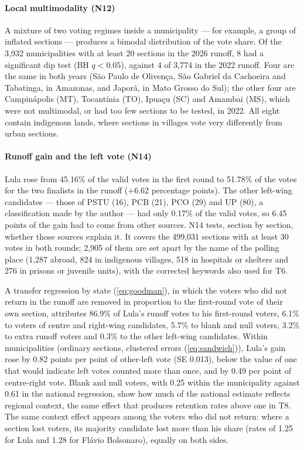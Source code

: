 \paragraph{Local multimodality (N12)} A mixture of two voting regimes inside
a municipality --- for example, a group of inflated sections --- produces a
bimodal distribution of the vote share. Of the 3,932 municipalities with at
least 20 sections in the 2026 runoff, 8 had a significant dip test (BH
$q<0.05$), against 4 of 3,774 in the 2022 runoff. Four are the same in both
years (S\~ao Paulo de Oliven\c{c}a, S\~ao Gabriel da Cachoeira and Tabatinga,
in Amazonas, and Japor\~a, in Mato Grosso do Sul); the other four are
Campin\'apolis (MT), Tocant\'inia (TO), Ipua\c{c}u (SC) and Amambai (MS),
which were not multimodal, or had too few sections to be tested, in 2022.
All eight contain indigenous lands, where sections in villages vote very
differently from urban sections.

\paragraph{Runoff gain and the left vote (N14)} Lula rose from 45.16\% of
the valid votes in the first round to 51.78\% of the votes for the two
finalists in the runoff (+6.62 percentage points). The other left-wing
candidates --- those of PSTU (16), PCB (21), PCO (29) and UP (80), a
classification made by the author --- had only 0.17\% of the valid votes,
so 6.45 points of the gain had to come from other sources. N14 tests,
section by section, whether those sources explain it. It covers the 499,031
sections with at least 30 votes in both rounds; 2,905 of them are set apart
by the name of the polling place (1,287 abroad, 824 in indigenous villages,
518 in hospitals or shelters and 276 in prisons or juvenile units), with the
corrected keywords also used for T6.

A transfer regression by state (\ref{eq:goodman}), in which the voters who
did not return in the runoff are removed in proportion to the first-round
vote of their own section, attributes 86.9\% of Lula's runoff votes to his
first-round voters, 6.1\% to voters of centre and right-wing candidates,
5.7\% to blank and null voters, 3.2\% to extra runoff voters and 0.3\% to
the other left-wing candidates. Within municipalities (ordinary sections,
clustered errors (\ref{eq:sandwich})), Lula's gain rose by 0.82 points per
point of other-left vote (SE 0.013), below the value of one that would
indicate left votes counted more than once, and by 0.49 per point of
centre-right vote. Blank and null voters, with 0.25 within the municipality
against 0.61 in the national regression, show how much of the national
estimate reflects regional context, the same effect that produces retention
rates above one in T8. The same context effect appears among the voters who
did not return: where a section lost voters, its majority candidate lost
more than his share (rates of 1.25 for Lula and 1.28 for Fl\'avio
Bolsonaro), equally on both sides.

